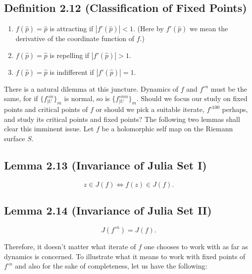 \documentclass[11pt,a4paper]{article}
\begin{document}
        \subsection*{Definition 2.12 (Classification of Fixed Points)}
        \begin{enumerate}
            \item $f(\hat{p}) = \hat{p}$ is attracting if $|f'(\hat{p})| < 1$. (Here by $f'(\hat{p})$ we mean the derivative of the coordinate function of $f$.)
            \item $f(\hat{p}) = \hat{p}$ is repelling if $|f'(\hat{p})| > 1$.
            \item $f(\hat{p}) = \hat{p}$ is indifferent if $|f'(\hat{p})| = 1$.
        \end{enumerate}



        There is a natural dilemma at this juncture. Dynamics of $f$ and $f^{\circ n}$ must be the same, for if $\{f^{\circ m}_{\big|U}\}_m$ is normal, so is $\{f^{\circ mn}_{\big|U}\}_m$. Should we focus our study on fixed points and critical points of $f$ or should we pick a suitable iterate, $f^{\circ 100}$ perhaps, and study its critical points and fixed points? The following two lemmas shall clear this imminent issue. Let $f$ be a holomorphic self map on the Riemann surface $S$.

        \subsection*{Lemma 2.13 (Invariance of Julia Set I)}
        $$z \in J(f) \iff f(z) \in J(f).$$


        \subsection*{Lemma 2.14 (Invariance of Julia Set II)}
        $$J(f^{\circ n}) = J(f).$$



        Therefore, it doesn't matter what iterate of $f$ one chooses to work with as far as dynamics is concerned. To illustrate what it means to work with fixed points of $f^{\circ n}$ and also for the sake of completeness, let us have the following:
\end{document}
